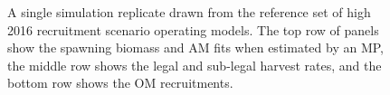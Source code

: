 \documentclass[11pt]{book}
\begin{document}
\newpage
\begin{landscape}
\begin{figure}[htb]

{\centering {} 

}

\caption{A single simulation replicate drawn from the reference set of high 2016 recruitment scenario operating models. The top row of panels show the spawning biomass and AM fits when estimated by an MP, the middle row shows the legal and sub-legal harvest rates, and the bottom row shows the OM recruitments.}\label{fig:unnamed-chunk-17}
\end{figure}
\newpage
\begin{figure}[htb]

{\centering {} 

}
\end{figure}
\end{landscape}
\end{document}
